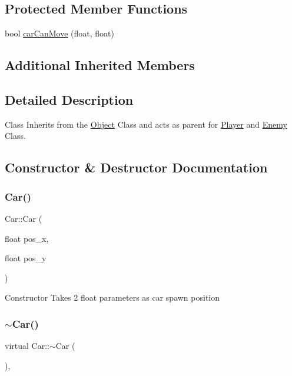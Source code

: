 \subsection*{Protected Member Functions}
\begin{DoxyCompactItemize}
\item 
bool \hyperlink{classCar_a912e7849671d8390a9907917c0722549}{car\+Can\+Move} (float, float)
\end{DoxyCompactItemize}
\subsection*{Additional Inherited Members}


\subsection{Detailed Description}
Class Inherits from the \hyperlink{classObject}{Object} Class and acts as parent for \hyperlink{classPlayer}{Player} and \hyperlink{classEnemy}{Enemy} Class. 

\subsection{Constructor \& Destructor Documentation}
\mbox{\label{classCar_a1dd7bb5e39c21d7cc21fb5464dc6e397}} 
\subsubsection{\texorpdfstring{Car()}{Car()}}
{\footnotesize\ttfamily Car\+::\+Car (\begin{DoxyParamCaption}\item[{float}]{pos\+\_\+x,  }\item[{float}]{pos\+\_\+y }\end{DoxyParamCaption})}

Constructor Takes 2 float parameters as car spawn position \mbox{\label{classCar_a6d0e7bf36bd2588f9c119cf1b76d8e21}} 
\subsubsection{\texorpdfstring{$\sim$\+Car()}{~Car()}}
{\footnotesize\ttfamily virtual Car\+::$\sim$\+Car (\begin{DoxyParamCaption}{ }\end{DoxyParamCaption})\hspace{0.3cm}{\ttfamily [virtual]}, {\ttfamily [default]}}

